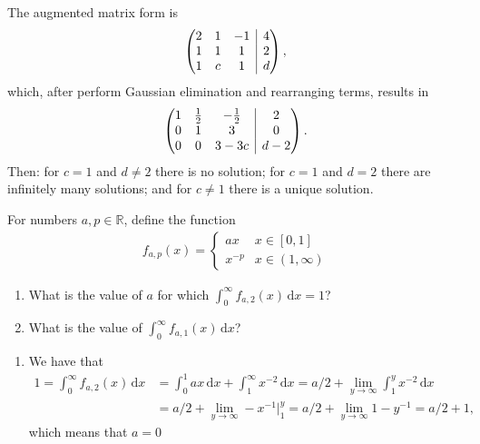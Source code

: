 \documentclass[11pt]{exam}
\newcommand{\BAR}{%
    \hspace{-\arraycolsep}%
    \strut\vrule %
    \hspace{-\arraycolsep}%
}
\begin{document}
\begin{questions}
\begin{solution}[0cm]
    The augmented matrix form is
    \[
    \begin{pmatrix}
    2 & 1 & -1 & \BAR & 4 \\
    1 & 1 & 1 & \BAR & 2 \\
    1 & c & 1 & \BAR & d
    \end{pmatrix},
    \]
    which, after perform Gaussian elimination and rearranging terms, results in
    \[
    \begin{pmatrix}
    1 & \frac{1}{2} & -\frac{1}{2} & \BAR & 2 \\
    0 & 1 & 3 & \BAR & 0 \\
    0 & 0 & 3 - 3c & \BAR & d - 2
    \end{pmatrix}.
    \]
    Then: for $c = 1$ and $d \neq 2$ there is no solution; for $c = 1$ and $d = 2$ there are infinitely many solutions; and for $c\neq 1$ there is a unique solution.
\end{solution}

\question[2]
    For numbers $a, p \in\mathbb{R}$, define the function
    \begin{align*}
        f_{a,p}(x) =
        \begin{cases}
        ax & x\in [0, 1] \\
        x^{-p} & x\in(1,\infty)
        \end{cases}
    \end{align*}

    \begin{enumerate}[leftmargin = 0.5cm, label = (\alph*), rightmargin = 0.2cm]
        
        \item What is the value of $a$ for which $\int_0^\infty f_{a, 2}(x)\,\mathrm{d}x = 1$?

        \item What is the value of $\int_0^\infty f_{a, 1}(x)\,\mathrm{d}x$?
        
    \end{enumerate}

\begin{solution}[0cm]
    \begin{enumerate}[leftmargin = 0.5cm, label = (\alph*), rightmargin = 0.2cm]
        
        \item We have that
        \begin{align*}
            1 = \int_0^\infty f_{a, 2}(x)\,\mathrm{d}x &= \int_0^1 ax\,\mathrm{d}x + \int_1^\infty x^{-2}\,\mathrm{d}x  
            = a/2 + \lim_{y\rightarrow\infty} \int_1^y x^{-2}\, \mathrm{d} x \\
            &= a/2 + \lim_{y\rightarrow\infty} -x^{-1}\big|_1^y = a/2 + \lim_{y\rightarrow\infty} 1-y^{-1} = a/2 + 1,
        \end{align*}
        which means that $a = 0$


\end{enumerate}
\end{solution}
\end{questions}
\end{document}
